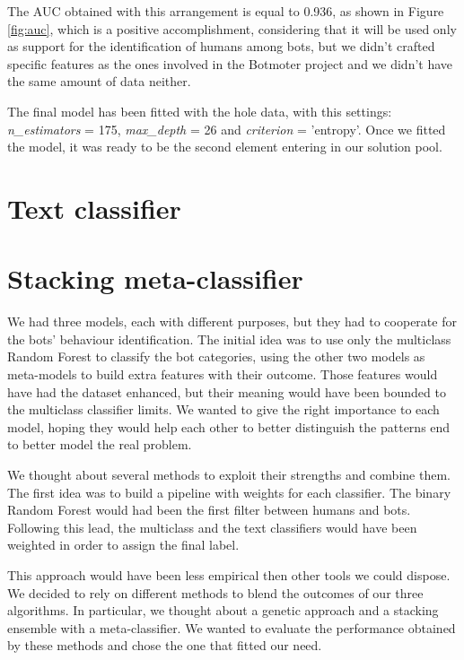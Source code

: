 The AUC obtained with this arrangement is equal to 0.936, as shown in Figure \ref{fig:auc}, which is a positive accomplishment, considering that it will be used only as support for the identification of humans among bots, but we didn't crafted specific features as the ones involved in the Botmoter project and we didn't have the same amount of data neither.

The final model has been fitted with the hole data, with this settings: \textit{ n\_estimators} = 175, \textit{max\_depth} = 26 and \textit{criterion} = 'entropy'.
Once we fitted the model, it was ready to be the second element entering in our solution pool.

\section{Text classifier}
\section{Stacking meta-classifier}
We had three models, each with different purposes, but they had to cooperate for the bots' behaviour identification.
The initial idea was to use only the multiclass Random Forest to classify the bot categories, using the other two models as meta-models to build extra features with their outcome.
Those features would have had the dataset enhanced, but their meaning would have been bounded to the multiclass classifier limits.
We wanted to give the right importance to each model, hoping they would help each other to better distinguish the patterns end to better model the real problem.

We thought about several methods to exploit their strengths and combine them.
The first idea was to build a pipeline with weights for each classifier. The binary Random Forest would had been the first filter between humans and bots. Following this lead, the multiclass and the text classifiers would have been weighted in order to assign the final label.

This approach would have been less empirical then other tools we could dispose. We decided to rely on different methods to blend the outcomes of our three algorithms. In particular, we thought about a genetic approach and a stacking ensemble with a meta-classifier. 
We wanted to evaluate the performance obtained by these methods and chose the one that fitted our need.

